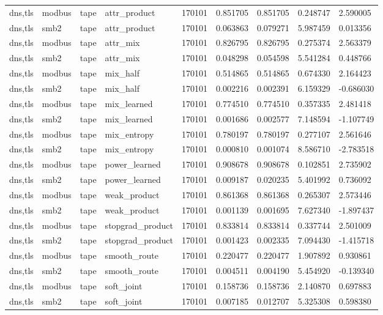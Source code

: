 \begin{tabular}{lllllllll}
dns,tls & modbus & tape & attr\_product & 170101 & 0.851705 & 0.851705 & 0.248747 & 2.590005 \\
dns,tls & smb2 & tape & attr\_product & 170101 & 0.063863 & 0.079271 & 5.987459 & 0.013356 \\
dns,tls & modbus & tape & attr\_mix & 170101 & 0.826795 & 0.826795 & 0.275374 & 2.563379 \\
dns,tls & smb2 & tape & attr\_mix & 170101 & 0.048298 & 0.054598 & 5.541284 & 0.448766 \\
dns,tls & modbus & tape & mix\_half & 170101 & 0.514865 & 0.514865 & 0.674330 & 2.164423 \\
dns,tls & smb2 & tape & mix\_half & 170101 & 0.002216 & 0.002391 & 6.159329 & -0.686030 \\
dns,tls & modbus & tape & mix\_learned & 170101 & 0.774510 & 0.774510 & 0.357335 & 2.481418 \\
dns,tls & smb2 & tape & mix\_learned & 170101 & 0.001686 & 0.002577 & 7.148594 & -1.107749 \\
dns,tls & modbus & tape & mix\_entropy & 170101 & 0.780197 & 0.780197 & 0.277107 & 2.561646 \\
dns,tls & smb2 & tape & mix\_entropy & 170101 & 0.000810 & 0.001074 & 8.586710 & -2.783518 \\
dns,tls & modbus & tape & power\_learned & 170101 & 0.908678 & 0.908678 & 0.102851 & 2.735902 \\
dns,tls & smb2 & tape & power\_learned & 170101 & 0.009187 & 0.020235 & 5.401992 & 0.736092 \\
dns,tls & modbus & tape & weak\_product & 170101 & 0.861368 & 0.861368 & 0.265307 & 2.573446 \\
dns,tls & smb2 & tape & weak\_product & 170101 & 0.001139 & 0.001695 & 7.627340 & -1.897437 \\
dns,tls & modbus & tape & stopgrad\_product & 170101 & 0.833814 & 0.833814 & 0.337744 & 2.501009 \\
dns,tls & smb2 & tape & stopgrad\_product & 170101 & 0.001423 & 0.002335 & 7.094430 & -1.415718 \\
dns,tls & modbus & tape & smooth\_route & 170101 & 0.220477 & 0.220477 & 1.907892 & 0.930861 \\
dns,tls & smb2 & tape & smooth\_route & 170101 & 0.004511 & 0.004190 & 5.454920 & -0.139340 \\
dns,tls & modbus & tape & soft\_joint & 170101 & 0.158736 & 0.158736 & 2.140870 & 0.697883 \\
dns,tls & smb2 & tape & soft\_joint & 170101 & 0.007185 & 0.012707 & 5.325308 & 0.598380 \\

\end{tabular}
